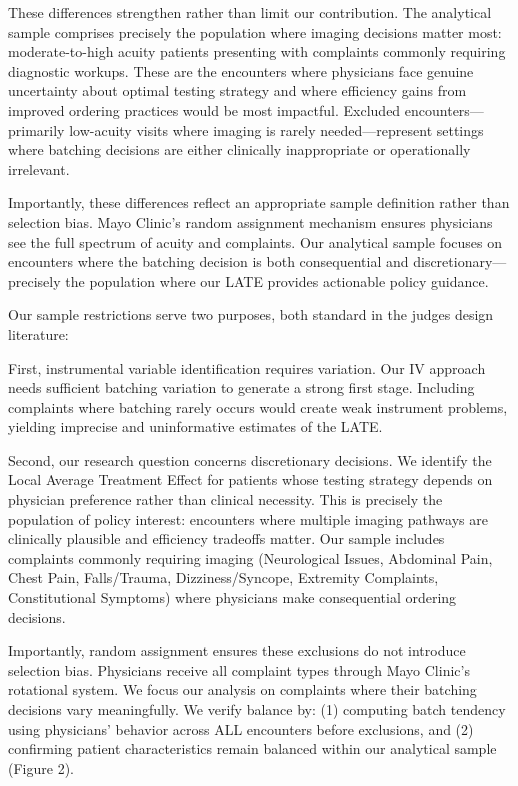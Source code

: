 \documentclass[11pt]{article}
\newcommand{\1}{\hbox{\rm 1\kern-.35em 1}}
\begin{document}
These differences strengthen rather than limit our contribution. The analytical sample comprises precisely the population where imaging decisions matter most: moderate-to-high acuity patients presenting with complaints commonly requiring diagnostic workups. These are the encounters where physicians face genuine uncertainty about optimal testing strategy and where efficiency gains from improved ordering practices would be most impactful. Excluded encounters—primarily low-acuity visits where imaging is rarely needed—represent settings where batching decisions are either clinically inappropriate or operationally irrelevant.

Importantly, these differences reflect an appropriate sample definition rather than selection bias. Mayo Clinic's random assignment mechanism ensures physicians see the full spectrum of acuity and complaints. Our analytical sample focuses on encounters where the batching decision is both consequential and discretionary—precisely the population where our LATE provides actionable policy guidance.

Our sample restrictions serve two purposes, both standard in the judges design literature:

First, instrumental variable identification requires variation. Our IV approach needs sufficient batching variation to generate a strong first stage. Including complaints where batching rarely occurs would create weak instrument problems, yielding imprecise and uninformative estimates of the LATE.

Second, our research question concerns discretionary decisions. We identify the Local Average Treatment Effect for patients whose testing strategy depends on physician preference rather than clinical necessity. This is precisely the population of policy interest: encounters where multiple imaging pathways are clinically plausible and efficiency tradeoffs matter. Our sample includes complaints commonly requiring imaging (Neurological Issues, Abdominal Pain, Chest Pain, Falls/Trauma, Dizziness/Syncope, Extremity Complaints, Constitutional Symptoms) where physicians make consequential ordering decisions.

Importantly, random assignment ensures these exclusions do not introduce selection bias. Physicians receive all complaint types through Mayo Clinic's rotational system. We focus our analysis on complaints where their batching decisions vary meaningfully. We verify balance by: (1) computing batch tendency using physicians' behavior across ALL encounters before exclusions, and (2) confirming patient characteristics remain balanced within our analytical sample (Figure 2).
\end{document}

